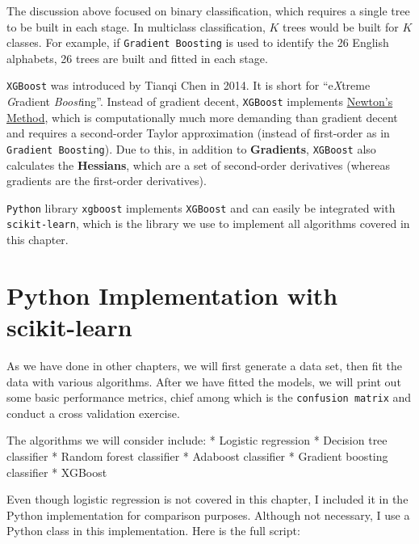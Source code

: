 \documentclass[
]{book}
\theoremstyle{definition}
\theoremstyle{definition}
\theoremstyle{definition}
\theoremstyle{definition}
\theoremstyle{remark}
\begin{document}
The discussion above focused on binary classification, which requires a single tree to be built in each stage. In multiclass classification, \(K\) trees would be built for \(K\) classes. For example, if \texttt{Gradient\ Boosting} is used to identify the 26 English alphabets, 26 trees are built and fitted in each stage.

\texttt{XGBoost} was introduced by Tianqi Chen in 2014. It is short for ``e\emph{X}treme \emph{G}radient \emph{Boost}ing''. Instead of gradient decent, \texttt{XGBoost} implements \href{https://en.wikipedia.org/wiki/Newton\%27s_method}{Newton's Method}, which is computationally much more demanding than gradient decent and requires a second-order Taylor approximation (instead of first-order as in \texttt{Gradient\ Boosting}). Due to this, in addition to \textbf{Gradients}, \texttt{XGBoost} also calculates the \textbf{Hessians}, which are a set of second-order derivatives (whereas gradients are the first-order derivatives).

\texttt{Python} library \texttt{xgboost} implements \texttt{XGBoost} and can easily be integrated with \texttt{scikit-learn}, which is the library we use to implement all algorithms covered in this chapter.

\hypertarget{python-implementation-with-scikit-learn}{%
\section{Python Implementation with scikit-learn}\label{python-implementation-with-scikit-learn}}

As we have done in other chapters, we will first generate a data set, then fit the data with various algorithms. After we have fitted the models, we will print out some basic performance metrics, chief among which is the \texttt{confusion\ matrix} and conduct a cross validation exercise.

The algorithms we will consider include:
* Logistic regression
* Decision tree classifier
* Random forest classifier
* Adaboost classifier
* Gradient boosting classifier
* XGBoost

Even though logistic regression is not covered in this chapter, I included it in the Python implementation for comparison purposes. Although not necessary, I use a Python class in this implementation. Here is the full script:
\end{document}

